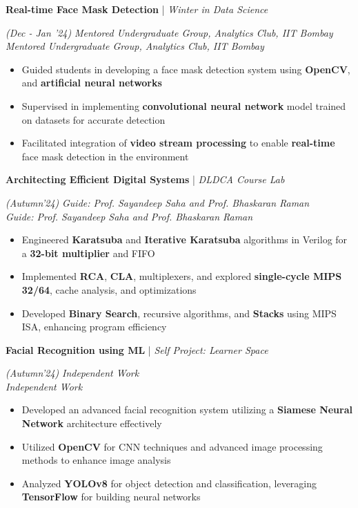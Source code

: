 \documentclass[10pt]{article}
\renewcommand{\subsection}[4]{
	\def\temp{#4}
	\vspace{2pt}
	{
		\large
		{\color{Green} \textbf{#1}} | {\sl #2} \filldate{#3}
		\ifx\temp\empty
		\else
		{
			\\[0.098em]
			\fontsize{10.5}{13.2}\selectfont
			\sl #4
		}
		\fi
	}
}
\newcommand{\filldate}[1]{\strut\hfill {\small \textit{(#1)}}}
\begin{document}
\subsection{Real-time Face Mask Detection}{Winter in Data Science}{Dec - Jan '24}{\textit{Mentored Undergraduate Group, Analytics Club, IIT Bombay}}  
\begin{itemize}
    \item Guided students in developing a face mask detection system using \textbf{OpenCV}, and \textbf{artificial neural networks}
    \item Supervised in implementing \textbf{convolutional neural network} model trained on datasets for accurate detection
    \item Facilitated integration of \textbf{video stream processing} to enable \textbf{real-time} face mask detection in the environment
\end{itemize}


\subsection{Architecting Efficient Digital Systems}{DLDCA Course Lab}{Autumn'24}{\textit{Guide: Prof. Sayandeep Saha and Prof. Bhaskaran Raman}}  
\begin{itemize}
    \item Engineered \textbf{Karatsuba} and \textbf{Iterative Karatsuba} algorithms in Verilog for a \textbf{32-bit multiplier} and FIFO
    \item Implemented \textbf{RCA}, \textbf{CLA}, multiplexers, and explored \textbf{single-cycle MIPS 32/64}, cache analysis, and optimizations  
    \item Developed \textbf{Binary Search}, recursive algorithms, and \textbf{Stacks} using MIPS ISA, enhancing program efficiency  
\end{itemize}

\subsection{Facial Recognition using ML}{Self Project: Learner Space}{Autumn'24}{\textit{Independent Work}}  
\begin{itemize}
   \item Developed an advanced facial recognition system utilizing a \textbf{Siamese Neural Network} architecture effectively
    \item Utilized \textbf{OpenCV} for CNN techniques and advanced image processing methods to enhance image analysis
    \item Analyzed \textbf{YOLOv8} for object detection and classification, leveraging \textbf{TensorFlow} for building neural networks 
\end{itemize}
\end{document}

